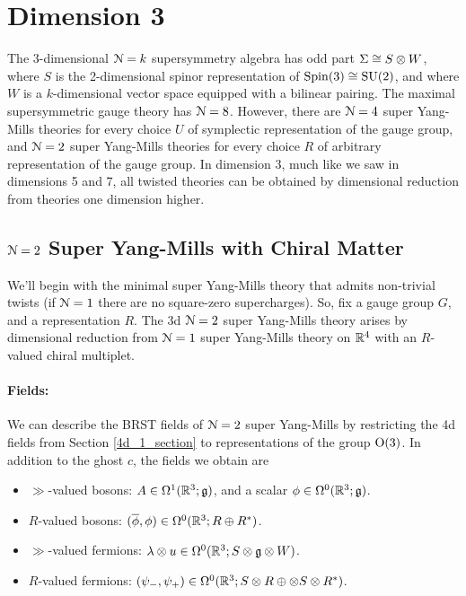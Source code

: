 \documentclass[10pt, oneside]{article}
\begin{document}
\section{Dimension 3}
The 3-dimensional $\mathcal{N}=k$ supersymmetry algebra has odd part $\Sigma \cong S \otimes W$, where $S$ is the 2-dimensional spinor representation of $\mathrm{Spin}(3) \cong \mathrm{SU}(2)$, and where $W$ is a $k$-dimensional vector space equipped with a bilinear pairing.  The maximal supersymmetric gauge theory has $\mathcal{N}=8$.  However, there are $\mathcal{N}=4$ super Yang-Mills theories for every choice $U$ of symplectic representation of the gauge group, and $\mathcal{N}=2$ super Yang-Mills theories for every choice $R$ of arbitrary representation of the gauge group.  In dimension 3, much like we saw in dimensions 5 and 7, all twisted theories can be obtained by dimensional reduction from theories one dimension higher.

\subsection{\texorpdfstring{$\mathcal N = 2$}{N=2} Super Yang-Mills with Chiral Matter} \label{3d_2_section}
We'll begin with the minimal super Yang-Mills theory that admits non-trivial twists (if $\mathcal{N}=1$ there are no square-zero supercharges).  So, fix a gauge group $G$, and a representation $R$.  The 3d $\mathcal{N}=2$ super Yang-Mills theory arises by dimensional reduction from $\mathcal{N}=1$ super Yang-Mills theory on $\mathbb R^4$ with an $R$-valued chiral multiplet.

\vspace{-10pt}
\paragraph{Fields:} We can describe the BRST fields of $\mathcal{N}=2$ super Yang-Mills by restricting the 4d fields from Section \ref{4d_1_section} to representations of the group $\mathrm{O}(3)$.  In addition to the ghost $c$, the fields we obtain are
\begin{itemize}
 \item $\gg$-valued bosons: $A \in \Omega^1(\mathbb R^3; \mathfrak{g})$, and a scalar $\phi \in \Omega^0(\mathbb R^3; \mathfrak{g})$.
 \item $R$-valued bosons: $(\overline{\phi}, \phi) \in \Omega^0(\mathbb R^3 ; R \oplus R^*)$.
 \item $\gg$-valued fermions: $\lambda \otimes u \in \Omega^0(\mathbb R^3 ; S \otimes \mathfrak{g} \otimes W)$.
 \item $R$-valued fermions: $(\psi_-,\psi_+) \in \Omega^0(\mathbb R^3 ; S \otimes R \oplus \otimes S \otimes R^*)$.
\end{itemize}
\end{document}
